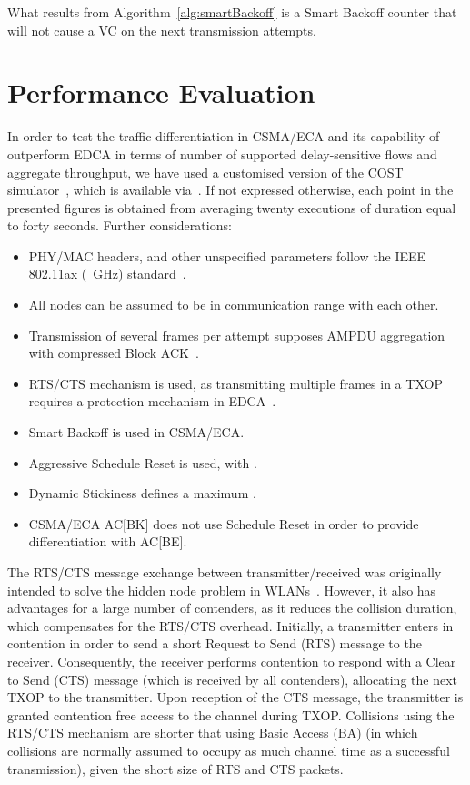 \documentclass[a4paper]{article}
\begin{document}
What results from Algorithm~\ref{alg:smartBackoff} is a Smart Backoff counter that will not cause a VC on the next transmission attempts.



\section{Performance Evaluation}\label{section4}
In order to test the traffic differentiation in CSMA/ECA and its capability of outperform EDCA in terms of number of supported delay-sensitive flows and aggregate throughput, we have used a customised version of the COST simulator~\cite{COST}, which is available via~\cite{CSMA-ECA-HEW}. If not expressed otherwise, each point in the presented figures is obtained from averaging twenty executions of duration equal to forty seconds. Further considerations:
	\begin{itemize}
		\item PHY/MAC headers, and other unspecified parameters follow the IEEE 802.11ax (~GHz) standard~\cite{IEEE80211ax}.
		\item All nodes can be assumed to be in communication range with each other.
		\item Transmission of several frames per attempt supposes AMPDU aggregation with compressed Block ACK~\cite{perahia2013next}.
		\item RTS/CTS mechanism is used, as transmitting multiple frames in a TXOP requires a protection mechanism in EDCA~\cite{80211e}.
\item Smart Backoff is used in CSMA/ECA.
		\item Aggressive Schedule Reset is used, with .
		\item Dynamic Stickiness defines a maximum .
		\item CSMA/ECA AC[BK] does not use Schedule Reset in order to provide differentiation with AC[BE].
	\end{itemize}

The RTS/CTS message exchange between transmitter/received was originally intended to solve the hidden node problem in WLANs~\cite{perahia2013next}. However, it also has advantages for a large number of contenders, as it reduces the collision duration, which compensates for the RTS/CTS overhead. Initially, a transmitter enters in contention in order to send a short Request to Send (RTS) message to the receiver. Consequently, the receiver performs contention to respond with a Clear to Send (CTS) message (which is received by all contenders), allocating the next TXOP to the transmitter. Upon reception of the CTS message, the transmitter is granted contention free access to the channel during TXOP. Collisions using the RTS/CTS mechanism are shorter that using Basic Access (BA) (in which collisions are normally assumed to occupy as much channel time as a successful transmission), given the short size of RTS and CTS packets.
\end{document}
